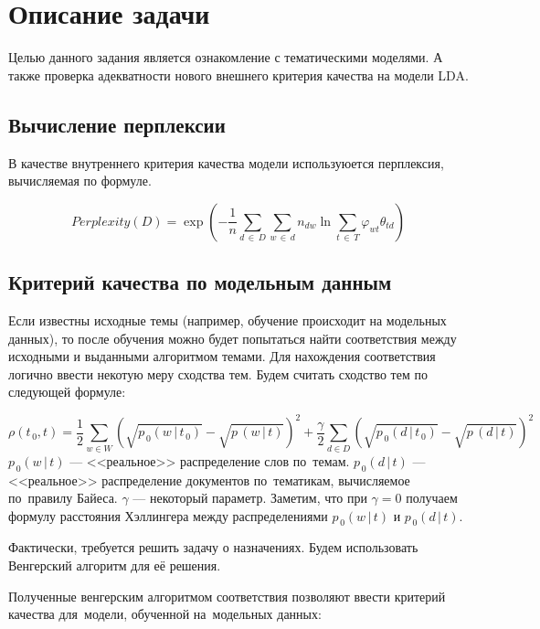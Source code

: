 \documentclass[12pt]{article}
\begin{document}
\section{Описание задачи}

Целью данного задания является ознакомление с тематическими моделями.
А также проверка адекватности нового внешнего критерия качества на модели LDA.

\subsection{Вычисление перплексии}

В качестве внутреннего критерия качества модели используюется перплексия, вычисляемая по формуле.

\[
  Perplexity(D) = 
    \exp\left(
      -\frac1{n}\sum_{d\,\in\,D} \sum_{w\,\in\,d} n_{dw} \ln\sum_{t\,\in\,T} \varphi_{wt} \theta_{td}
    \right)
\]

\subsection{Критерий качества по модельным данным}

Если известны исходные темы (например, обучение происходит на модельных данных), то после обучения можно будет попытаться найти соответствия между исходными и выданными алгоритмом темами.
Для нахождения соответствия логично ввести некотую меру сходства тем.
Будем считать сходство тем по следующей формуле:

\[
  \rho(t_{\,0},t) = 
    \frac12\sum_{w\in W}\left(
      \sqrt{p_{\,0}(w\,|\,t_{\,0})} - \sqrt{p\,(w\,|\,t)}
    \right)^2 + 
    \frac\gamma2\!\sum_{d\in D}\left(
      \sqrt{p_{\,0}(d\,|\,t_{\,0})} - \sqrt{p\,(d\,|\,t)}
    \right)^2
\]
$\displaystyle p_{\,0}(w\,|\,t) $ --- <<реальное>> распределение слов по~темам. \newline
$\displaystyle p_{\,0}(d\,|\,t) $ --- <<реальное>> распределение документов по~тематикам, вычисляемое по~правилу Байеса.\newline
$\displaystyle \gamma $ --- некоторый параметр. 
Заметим, что при $ \gamma = 0 $ получаем формулу расстояния Хэллингера между распределениями $ p_{\,0}(w\,|\,t) $ и $ p_{\,0}(d\,|\,t) $.

Фактически, требуется решить задачу о назначениях.
Будем использовать Венгерский алгоритм для её решения.

Полученные венгерским алгоритмом соответствия позволяют ввести критерий качества для~модели, обученной на~модельных данных:
\end{document}
